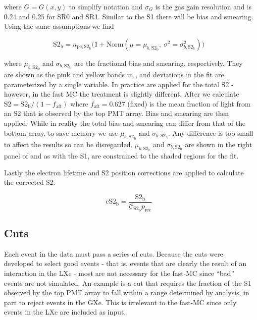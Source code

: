 \noindent where $G = G(x, y)$ to simplify notation and $\sigma_G$ is the gas gain resolution and is 0.24 and 0.25 for SR0 and
SR1.  Similar to the S1 there will be bias and smearing.  Using the same assumptions we find

\begin{equation}
\mathrm{S2_b} = n_{\mathrm{pe,S2_b}} \Big( 1 + \mathrm{Norm}(\mu = \mu_{b, \mathrm{S2_b}},\ \sigma^2 = \sigma_{b, \mathrm{S2_b}}^2) \Big)
\label{eq:er_nr_calibrations_parameter_determ_det_phys_s2_bias_smear}
\end{equation}

\noindent where $\mu_{b, \mathrm{S2_b}}$ and $\sigma_{b, \mathrm{S2_b}}$ are the \stwob fractional bias and smearing,
respectively.  They are shown as the pink and yellow bands in , and
deviations in the fit are parameterized by a single variable.  In
practice  are applied
for the total S2 - however, in the fast MC the treatment is slightly different.  After
 we calculate
$\mathrm{S2} = \mathrm{S2_b} / (1 - f_{\mathrm{aft}})$ where $f_{\mathrm{aft}} = 0.627$ (fixed) is the mean fraction of light from an
S2 that is observed by the top PMT array.  Bias and smearing are then applied.  While in reality the total bias and smearing
can differ from that of the bottom array, to save memory we use $\mu_{b, \mathrm{S2_b}}$ and $\sigma_{b, \mathrm{S2_b}}$.  Any
difference is too small to affect the results so can be disregarded.  $\mu_{b, \mathrm{S2_b}}$ and $\sigma_{b, \mathrm{S2_b}}$ are shown
in the right panel of  and as with the S1, are constrained to the
shaded regions for the fit.

Lastly the electron lifetime and S2 position corrections are applied to calculate the corrected S2.

\begin{equation}
\mathrm{cS2_b} = \frac{\mathrm{S2_b}}{\mathcal{C}_{\mathrm{S2_b}} p_{\mathrm{rec}}}
\end{equation}



\subsection{Cuts}
\label{subsec:er_nr_calibrations_parameter_determ_cuts}
Each event in the data must pass a series of cuts.  Because the cuts were developed to select good events - that is, events that are
clearly the result of an interaction in the LXe - most are not necessary for the fast-MC since ``bad'' events are not simulated.  An
example is a cut that requires the fraction of the S1 observed by the top PMT array to fall within a range determined by analysis, in
part to reject events in the GXe.  This is irrelevant to the fast-MC since only events in the LXe are included as input.

